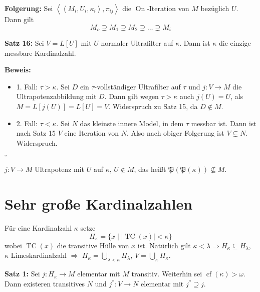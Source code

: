 \documentclass[a4paper,fontsize=11pt]{scrartcl}
\newcommand{\TC}{\operatorname{TC}}
\newcommand{\On}{\operatorname{On}}
\newcommand{\cf}{\operatorname{cf}}
\begin{document}
{\bf Folgerung:} Sei $\left< \left<M_i, U_i, \kappa_i\right>, \pi_{ij}\right>$ die $\On$-Iteration von $M$ bezüglich $U$. Dann gilt
$$ M_o \supsetneq M_1 \supsetneq M_2 \supsetneq \ldots \supsetneq M_i $$

{\bf Satz 16:} Sei $V=L[U]$ mit $U$ normaler Ultrafilter auf $\kappa$. Dann ist $\kappa$ die einzige messbare Kardinalzahl.

{\bf Beweis:}
\begin{itemize}
  \item 1. Fall: $\tau > \kappa$. Sei $D$ ein $\tau$-vollständiger Ultrafilter auf $\tau$ und $j:V\rightarrow M$ die Ultrapotenzabbildung mit
    $D$. Dann gilt wegen $\tau>\kappa$ auch $j(U)=U$, als $M=L[j(U)]=L[U]=V$. Widerspruch zu Satz 15, da $D\not\in M$.
  \item 2. Fall: $\tau < \kappa$. Sei $N$ das kleinste innere Model, in dem $\tau$ messbar ist. Dann ist nach Satz 15 $V$ eine Iteration von $N$. Also
    nach obiger Folgerung ist $V\subsetneq N$. Widerspruch.
\end{itemize}
 \hfill $\square$

$j:V\rightarrow M$ Ultrapotenz mit $U$ auf $\kappa$, $U\not\in M$, das heißt $\mathfrak{P}(\mathfrak{P}(\kappa))\not\subseteq M$.


\section{Sehr große Kardinalzahlen}
Für eine Kardinalzahl $\kappa$ setze $$H_\kappa=\{x\mid |\TC(x)|<\kappa\}$$ wobei $\TC(x)$ die transitive Hülle von $x$ ist. Natürlich gilt
$\kappa<\lambda\Rightarrow H_\kappa\subseteq H_\lambda$, $\kappa$ Limeskardinalzahl $\Rightarrow$ $H_\kappa = \bigcup\limits_{\lambda<\kappa}
H_\lambda$, $V=\bigcup\limits_\kappa H_\kappa$.

{\bf Satz 1:} Sei $j:H_\kappa\rightarrow M$ elementar mit $M$ transitiv. Weiterhin sei $\cf(\kappa)>\omega$. Dann existeren transitives $N$ und
$j^*:V\rightarrow N$ elementar mit $j^*\supseteq j$.
\end{document}
